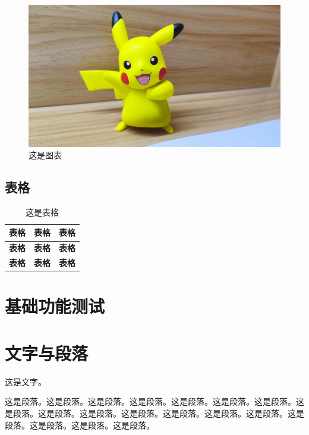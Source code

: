 \begin{ujnbody}
    \begin{figure}[htbp]
        \centering
        \includegraphics[scale=0.1, ]{figures/pikachu.jpg}
        \caption{这是图表}
    \end{figure}

    \subsection{表格}

    \begin{table}[htbp]
        \centering
        \caption{这是表格}
        \begin{tabular}{|c|c|c|}
            \hline
            \multicolumn{1}{|c|}{\textbf{表格}} & \multicolumn{1}{c|}{\textbf{表格}} & \multicolumn{1}{c|}{\textbf{表格}} \\ \hline
            \multicolumn{1}{|c|}{\textbf{表格}} & \multicolumn{1}{c|}{\textbf{表格}} & \multicolumn{1}{c|}{\textbf{表格}} \\ \hline
            \multicolumn{1}{|c|}{\textbf{表格}} & \multicolumn{1}{c|}{\textbf{表格}} & \multicolumn{1}{c|}{\textbf{表格}} \\ \hline
        \end{tabular}
    \end{table}
    \section{基础功能测试}
    \section{文字与段落}
    这是文字。

    这是段落。这是段落。这是段落。这是段落。这是段落。这是段落。这是段落。这是段落。这是段落。这是段落。这是段落。这是段落。这是段落。这是段落。这是段落。这是段落。这是段落。这是段落。

\end{ujnbody}
